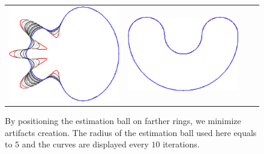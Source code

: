 {\begin{figure}
\begin{tabular}{p{3em}ccc}
\includegraphics[scale=0.25]{figures/chapter6/level-effect/flower/improve/len_pen0/radius-5/level5/summary.pdf} &
\includegraphics[scale=0.25]{figures/chapter6/level-effect/bean/improve/len_pen0/radius-5/level5/summary.pdf} \\[2em]
\end{tabular}
\caption{By positioning the estimation ball on farther rings, we minimize artifacts creation. The radius of the estimation ball used here equals to $5$ and the curves are displayed every $10$ iterations. \label{fig:mx-square-flow}}
\end{figure}


}
